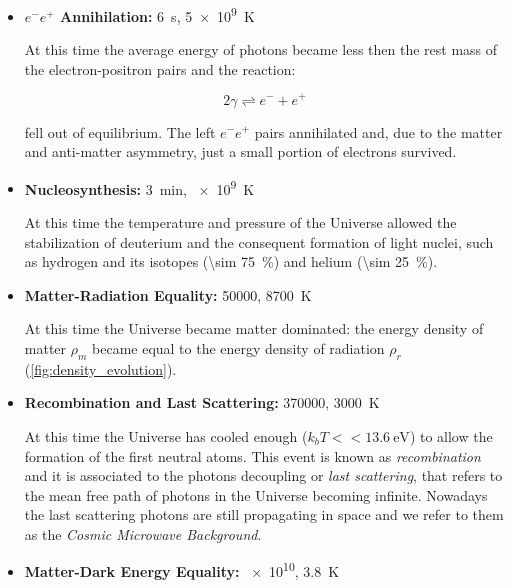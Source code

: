 \begin{itemize}
        \item \textbf{$e^-e^+$ Annihilation:} \SI{6}{\second},
        \SI{5e9}{\kelvin}

        At this time the average energy of photons became less then the rest mass
        of the electron-positron pairs and the reaction:

        \begin{equation}
                2\gamma \rightleftharpoons e^- + e^+
        \end{equation}

        fell out of equilibrium. The left $e^-e^+$ pairs annihilated and,
        due to the matter and anti-matter asymmetry, just a small portion
        of electrons survived.

        \item \textbf{Nucleosynthesis:} \SI{3}{\minute}, \SI{e9}{\kelvin}

        At this time the temperature and pressure of the Universe allowed
        the stabilization of deuterium and the consequent formation of
        light nuclei, such as hydrogen and its isotopes
        (\SI{\sim 75}{\percent}) and helium (\SI{\sim 25}{\percent}).

        \item \textbf{Matter-Radiation Equality:} \SI{50000}{\year},
        \SI{8700}{\kelvin}

        At this time the Universe became matter dominated: the energy
        density of matter $\rho_m$ became equal to the energy density of
        radiation $\rho_r$ (\autoref{fig:density_evolution}).

        \item \textbf{Recombination and Last Scattering:} \SI{370000}{\year},
        \SI{3000}{\kelvin}

        At this time the Universe has cooled enough ($k_bT <<
        \SI{13.6}{\electronvolt}$) to allow the formation of the first
        neutral atoms. This event is known as \emph{recombination} and it is
        associated to the photons decoupling or \emph{last scattering}, that
        refers to the mean free path of photons in the Universe becoming
        infinite. Nowadays the last scattering photons are still propagating in
        space and we refer to them as the \emph{Cosmic Microwave Background}.

        \item \textbf{Matter-Dark Energy Equality:} \SI{e10}{\year},
        \SI{3.8}{\kelvin}


\end{itemize}
